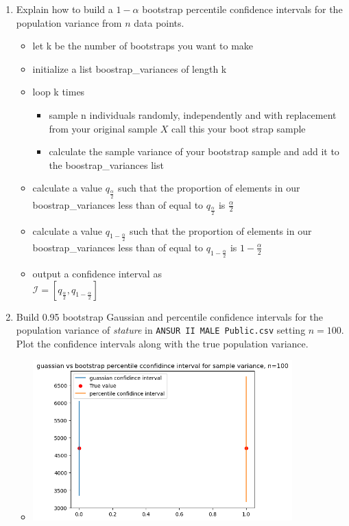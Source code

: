 \documentclass[12pt,twoside]{article}
\begin{document}
\begin{enumerate}
\begin{enumerate}
\item Explain how to build a $1-\alpha$ bootstrap percentile confidence intervals for the population variance from $n$ data points.
\begin{itemize}
    \color{blue}
    \item let k be the number of bootstraps you want to make 
    \item initialize a list boostrap\_variances of length k 
    \item loop k times
    \begin{itemize}
    \item sample n individuals randomly, independently and with replacement from your original sample $X$ call this your boot strap sample
    \item calculate the sample variance of your bootstrap sample and add it to the  boostrap\_variances list
        \end{itemize}
    \item calculate a value $q_{\frac{\alpha}{2}}$ such that the proportion of elements in our  boostrap\_variances less than of equal to  $q_{\frac{\alpha}{2}}$ is $\frac{\alpha}{2}$
   \item calculate a value $q_{1-\frac{\alpha}{2}}$ such that the proportion of elements in our  boostrap\_variances less than of equal to  $q_{1-\frac{\alpha}{2}}$ is $1-\frac{\alpha}{2}$
    \item output a confidence interval as\\ $\mathcal{I}=[q_{\frac{\alpha}{2}},q_{1-\frac{\alpha}{2}}]$
\end{itemize}




\item Build 0.95 bootstrap Gaussian and percentile confidence intervals for the population variance of \textit{stature} in \texttt{ANSUR\ II\ MALE\ Public.csv} setting $n=100$. Plot the confidence intervals along with the true population variance. 
\begin{itemize}
    \color{blue}
    \item \includegraphics[width=10cm]{homework/homework_5/immages/quistion2b_1.png}
\end{itemize}


\end{enumerate}
\end{enumerate}
\end{document}
